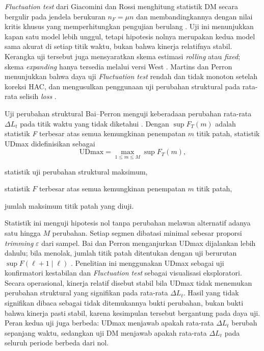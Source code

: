 \textit{Fluctuation test} dari Giacomini dan Rossi menghitung statistik DM
secara bergulir pada jendela berukuran $n_F = \mu n$ dan membandingkannya dengan
nilai kritis khusus yang memperhitungkan pengujian berulang
\cite{giacomini2010}. Uji ini menunjukkan kapan satu model lebih unggul, tetapi
hipotesis nolnya merupakan kedua model sama akurat di setiap titik waktu,
bukan bahwa kinerja relatifnya stabil. Kerangka uji tersebut juga mensyaratkan
skema estimasi \textit{rolling} atau \textit{fixed}; skema \textit{expanding}
hanya tersedia melalui versi West \cite{giacomini2010}. Martins dan Perron menunjukkan bahwa daya uji
\textit{Fluctuation test} rendah dan tidak monoton setelah koreksi HAC, dan
mengusulkan penggunaan uji perubahan struktural pada rata-rata selisih
\textit{loss} \cite{martins2016}.

Uji perubahan struktural Bai--Perron menguji keberadaan perubahan rata-rata
$\Delta L_t$ pada titik waktu yang tidak diketahui \cite{bai1998}. Dengan
$\sup F_T(m)$ adalah statistik \textit{F} terbesar atas semua kemungkinan
penempatan $m$ titik patah, statistik UDmax didefinisikan sebagai
\begin{equation}
  \text{UDmax} = \max_{1 \le m \le M} \sup F_T(m),
  \label{eq:udmax}
\end{equation}
\begin{keterangan}
  \item[$\text{UDmax}$] statistik uji perubahan struktural maksimum,
  \item[$\sup F_T(m)$] statistik $F$ terbesar atas semua kemungkinan
    penempatan $m$ titik patah,
  \item[$M$] jumlah maksimum titik patah yang diuji.
\end{keterangan}
Statistik ini menguji hipotesis nol tanpa perubahan melawan alternatif adanya
satu hingga $M$ perubahan. Setiap segmen dibatasi minimal sebesar proporsi
\textit{trimming} $\varepsilon$ dari sampel. Bai dan Perron menganjurkan UDmax
dijalankan lebih dahulu; bila menolak, jumlah titik patah ditentukan dengan uji
berurutan $\sup F(\ell+1 \mid \ell)$ \cite{bai2003}. Penelitian ini menggunakan
UDmax sebagai uji konfirmatori kestabilan dan \textit{Fluctuation test} sebagai
visualisasi eksploratori. Secara operasional, kinerja relatif disebut stabil
bila UDmax tidak menemukan perubahan struktural yang signifikan pada rata-rata
$\Delta L_t$. Hasil yang tidak signifikan dibaca sebagai tidak ditemukannya
bukti perubahan, bukan bukti bahwa kinerja pasti stabil, karena kesimpulan
tersebut bergantung pada daya uji. Peran kedua uji juga berbeda: UDmax
menjawab apakah rata-rata $\Delta L_t$ berubah sepanjang waktu, sedangkan uji
DM menjawab apakah rata-rata $\Delta L_t$ pada seluruh periode berbeda dari
nol.



